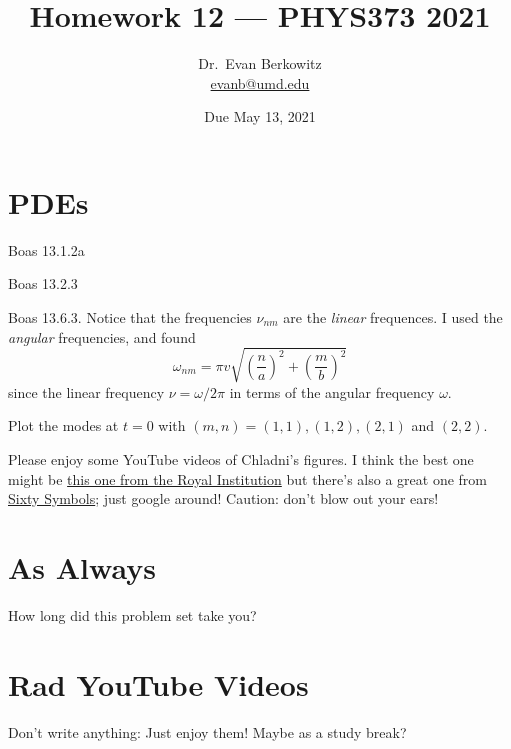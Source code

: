 \documentclass[answers]{exam}\newcommand{\repositoryInformationSetup}{     \usepackage[dvipsnames]{xcolor}     \usepackage[ angle=90, color=black, opacity=1, scale=2, ]{background}      \SetBgPosition{current page.west}      \SetBgVshift{-4.5mm}      \backgroundsetup{contents={{\color{green}\texttt{-{}-} differs from commit \texttt{f3526e2} in 0 files}}} } \newcommand{\commit}{{{\color{green}f3526e2}}}\usepackage{amsmath}
\begin{document}
\title{Homework 12 --- PHYS373 2021}

\author{Dr.~Evan Berkowitz	\\
\href{mailto:evanb@umd.edu}{evanb@umd.edu}}

\date{Due May 13, 2021}

\maketitle

\begin{questions}

	\section*{PDEs}
	\question Boas 13.1.2a

\begin{solution}\end{solution}
 	\question Boas 13.2.3

\begin{solution}\end{solution}
 	\question Boas 13.6.3.  Notice that the frequencies $\nu_{nm}$ are the \emph{linear} frequences.  I used the \emph{angular} frequencies, and found
\begin{equation}
	\omega_{nm} = \pi v \sqrt{\left(\frac{n}{a}\right)^2 + \left(\frac{m}{b}\right)^2}
\end{equation}
since the linear frequency $\nu = \omega/2\pi$ in terms of the angular frequency $\omega$.

Plot the modes at $t=0$ with $(m,n)=(1,1), (1,2), (2,1)$ and $(2,2)$.

Please enjoy some YouTube videos of Chladni's figures.  I think the best one might be \href{https://www.youtube.com/watch?v=OLNFrxgMJ6E}{this one from the Royal Institution} but there's also a great one from \href{https://www.youtube.com/watch?v=dTReFclu_PU}{Sixty Symbols}; just google around!  Caution: don't blow out your ears!

\begin{solution}\end{solution}
 

	\clearpage
	\section*{As Always}
	\question How long did this problem set take you?
	
	\section*{Rad YouTube Videos}
	Don't write anything: Just enjoy them!  Maybe as a study break?


\end{questions}
\end{document}
